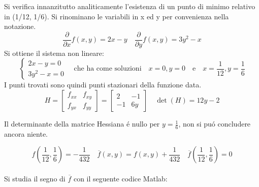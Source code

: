 \begin{center}
\footnotesize\noindent{}\end{center}

\noindent Si verifica innanzitutto analiticamente l'esistenza di un punto di minimo relativo in (1/12, 1/6). Si rinominano le variabili in x ed y per convenienza nella notazione.
\[
\frac{\partial}{\partial x}f(x,y) = 2x -y \quad \frac{\partial}{\partial y}f(x,y) = 3y^2 - x
\]
\noindent Si ottiene il sistema non lineare:
\[
\begin{cases}
2x -y = 0 \\
3y^2 - x = 0
\end{cases}
\quad \text{che ha come soluzioni} \quad x=0, y=0 \quad \text{e} \quad x=\frac{1}{12}, y=\frac{1}{6}
\]
\noindent I punti trovati sono quindi punti stazionari della funzione data.
\[
H =
\begin{bmatrix} f_{xx} & f_{xy} \\ f_{yx} & f_{yy} \end{bmatrix}
=
\begin{bmatrix} 2 & -1 \\ -1 & 6y \end{bmatrix}
\quad
\det(H) = 12y -2
\]

\noindent Il determinante della matrice Hessiana \'e nullo per \(y=\frac{1}{6}\), non si pu\'o concludere ancora niente.

\[
f(\frac{1}{12}, \frac{1}{6}) = -\frac{1}{432} \quad \overline{f}(x,y) = f(x,y) + \frac{1}{432} \quad \overline{f}(\frac{1}{12}, \frac{1}{6}) = 0
\]
\\

\noindent Si studia il segno di \(\overline{f} \) con il seguente codice Matlab:
\\


